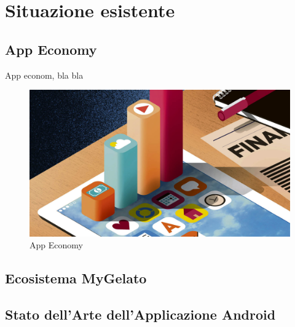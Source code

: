 \section{Situazione esistente}

\subsection{App Economy}
  
App econom, bla bla
  
\begin{figure}[h!]
  \includegraphics[width=\linewidth]{images/The-App-Economy.jpg}
  \caption{App Economy}
  \label{fig:appEconomy1}
\end{figure}

\subsection{Ecosistema MyGelato}

\subsection{Stato dell’Arte dell’Applicazione Android}
\newpage
